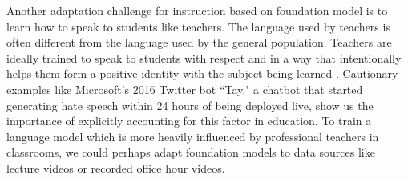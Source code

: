 
Another adaptation challenge for instruction based on foundation model is to learn how to speak to students like teachers. The language used by teachers is often different from the language used by the general population. Teachers are ideally trained to speak to students with respect and in a way that intentionally helps them form a positive identity with the subject being learned \cite{truax2018edlang}. Cautionary examples like Microsoft's 2016 Twitter bot ``Tay," a chatbot that started generating hate speech within 24 hours of being deployed live, show us the importance of explicitly accounting for this factor in education. 
To train a language model which is more heavily influenced by professional teachers in classrooms, we could perhaps adapt foundation models to data sources like lecture videos or recorded office hour videos.

